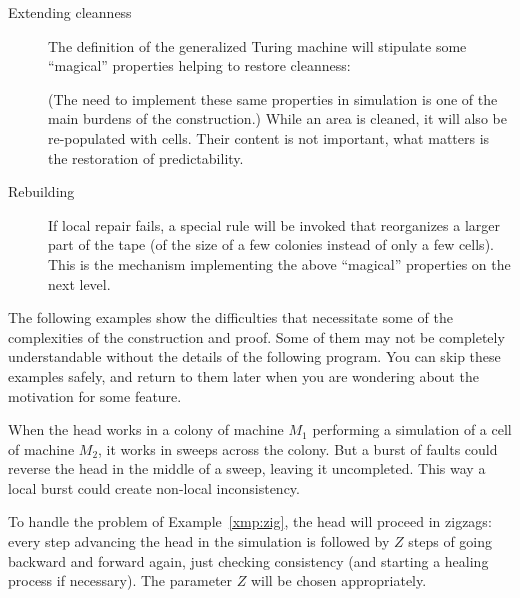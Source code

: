 \documentclass[11pt]{memoir}
\theoremstyle{definition} %
\newcommand{\Z}{Z}
\begin{document}
\begin{description}
\item[Extending cleanness]
  The definition of the generalized Turing machine will stipulate some ``magical'' properties
  helping to restore cleanness:
(The need to implement these same properties in simulation is one of the
main burdens of the construction.)
While an area is cleaned, it will also be re-populated with cells.
Their content is not important, what matters is the restoration of predictability.

\item[Rebuilding] If local repair fails, a special rule will be invoked that reorganizes a
larger part of the tape (of the size of a few colonies instead of only a few cells).
This is the mechanism implementing the above ``magical'' properties on the next level.
\end{description}

The following examples show the difficulties that necessitate some of the complexities of the
construction and proof.
Some of them may not be completely understandable without the details of the following program.
You can skip these examples safely, and return to them later when you are wondering
about the motivation for some feature.

\begin{example}\label{xmp:zig}
  When the head works in a colony of machine \( M_{1} \)
  performing a simulation of a cell of machine \( M_{2} \), it works in sweeps across the colony.
  But a burst of faults could reverse the head in the middle of a sweep, leaving it uncompleted.
  This way a local burst could create non-local inconsistency.
\end{example}

To handle the problem of Example~\ref{xmp:zig}, the head will proceed in zigzags: every
  step advancing the head in the simulation
  is followed by \( \Z \) steps of going backward and forward again, just checking consistency
  (and starting a healing process if necessary).
  The parameter \( \Z \) will be chosen appropriately.
\end{document}
